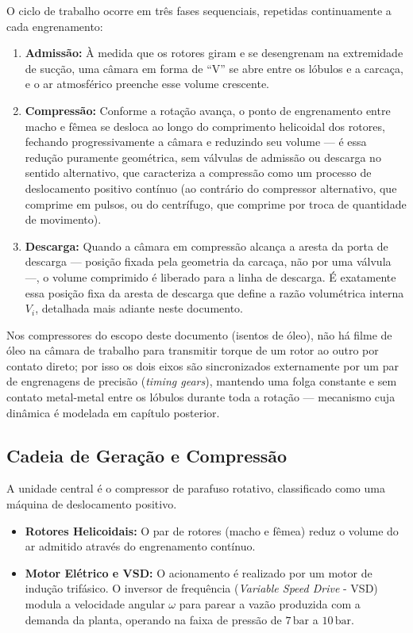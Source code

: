 \documentclass[12pt,a4paper]{article}
\numberwithin{equation}{section}
\numberwithin{table}{section}
\numberwithin{figure}{section}
\begin{document}
	O ciclo de trabalho ocorre em três fases sequenciais, repetidas continuamente a cada engrenamento:
	\begin{enumerate}
		\item \textbf{Admissão:} À medida que os rotores giram e se desengrenam na extremidade de sucção, uma câmara em forma de ``V'' se abre entre os lóbulos e a carcaça, e o ar atmosférico preenche esse volume crescente.
		\item \textbf{Compressão:} Conforme a rotação avança, o ponto de engrenamento entre macho e fêmea se desloca ao longo do comprimento helicoidal dos rotores, fechando progressivamente a câmara e reduzindo seu volume — é essa redução puramente geométrica, sem válvulas de admissão ou descarga no sentido alternativo, que caracteriza a compressão como um processo de deslocamento positivo contínuo (ao contrário do compressor alternativo, que comprime em pulsos, ou do centrífugo, que comprime por troca de quantidade de movimento).
		\item \textbf{Descarga:} Quando a câmara em compressão alcança a aresta da porta de descarga — posição fixada pela geometria da carcaça, não por uma válvula —, o volume comprimido é liberado para a linha de descarga. É exatamente essa posição fixa da aresta de descarga que define a razão volumétrica interna $V_i$, detalhada mais adiante neste documento.
	\end{enumerate}
	Nos compressores do escopo deste documento (isentos de óleo), não há filme de óleo na câmara de trabalho para transmitir torque de um rotor ao outro por contato direto; por isso os dois eixos são sincronizados externamente por um par de engrenagens de precisão (\textit{timing gears}), mantendo uma folga constante e sem contato metal-metal entre os lóbulos durante toda a rotação — mecanismo cuja dinâmica é modelada em capítulo posterior.

	\subsection{\textbf{Cadeia de Geração e Compressão}}
	A unidade central é o compressor de parafuso rotativo, classificado como uma máquina de deslocamento positivo.
	\begin{itemize}
		\item \textbf{Rotores Helicoidais:} O par de rotores (macho e fêmea) reduz o volume do ar admitido através do engrenamento contínuo.
		\item \textbf{Motor Elétrico e VSD:} O acionamento é realizado por um motor de indução trifásico. O inversor de frequência (\textit{Variable Speed Drive} - VSD) modula a velocidade angular $\omega$ para parear a vazão produzida com a demanda da planta, operando na faixa de pressão de $7\,\text{bar}$ a $10\,\text{bar}$.
	\end{itemize}
\end{document}
